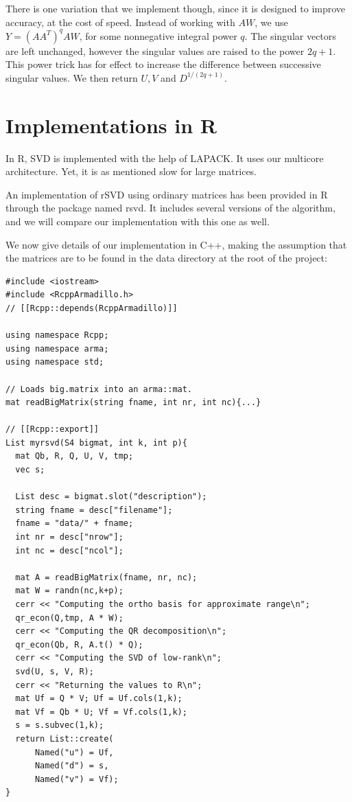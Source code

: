 \documentclass[a4paper,11pt]{amsart}
\begin{document}
There is one variation that we implement though, since it is designed to improve accuracy, at the cost of speed. Instead of working with $AW$, we use $Y=(AA^T)^qAW$, for some nonnegative integral power $q$. The singular vectors are left unchanged, however the singular values are raised to the power $2q+1$. This power trick has for effect to increase the difference between successive singular values. We then return $U,V$ and $D^{1/(2q+1)}$.

\section{Implementations in R}
In R, SVD is implemented with the help of LAPACK. It uses our multicore architecture. Yet, it is as mentioned slow for large matrices.

An implementation of rSVD using ordinary matrices has been provided in R through the package named rsvd. It includes several versions of the algorithm, and we will compare our implementation with this one as well.

We now give details of our implementation in C++, making the assumption that the matrices are to be found in the data directory at the root of the project:
\begin{verbatim}
#include <iostream>
#include <RcppArmadillo.h>
// [[Rcpp::depends(RcppArmadillo)]]

using namespace Rcpp;
using namespace arma;
using namespace std;

// Loads big.matrix into an arma::mat.
mat readBigMatrix(string fname, int nr, int nc){...}

// [[Rcpp::export]]
List myrsvd(S4 bigmat, int k, int p){
  mat Qb, R, Q, U, V, tmp;
  vec s;

  List desc = bigmat.slot("description");
  string fname = desc["filename"];
  fname = "data/" + fname;
  int nr = desc["nrow"];
  int nc = desc["ncol"];

  mat A = readBigMatrix(fname, nr, nc);
  mat W = randn(nc,k+p);
  cerr << "Computing the ortho basis for approximate range\n";
  qr_econ(Q,tmp, A * W);
  cerr << "Computing the QR decomposition\n";
  qr_econ(Qb, R, A.t() * Q);
  cerr << "Computing the SVD of low-rank\n";
  svd(U, s, V, R);
  cerr << "Returning the values to R\n";
  mat Uf = Q * V; Uf = Uf.cols(1,k);
  mat Vf = Qb * U; Vf = Vf.cols(1,k);
  s = s.subvec(1,k);
  return List::create(
      Named("u") = Uf,
      Named("d") = s,
      Named("v") = Vf);
}
\end{verbatim}
\end{document}
